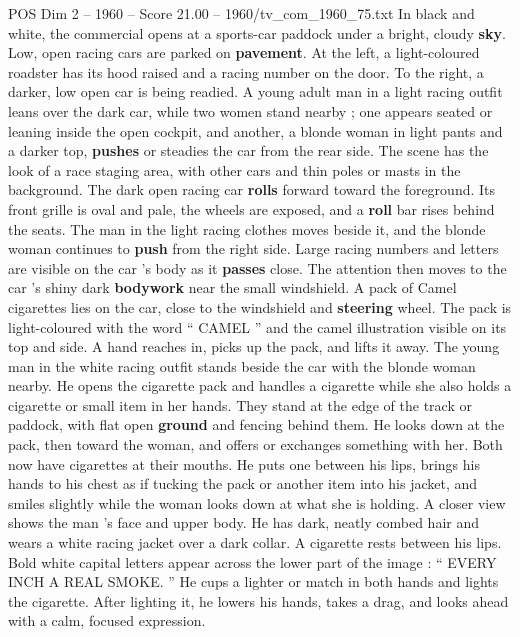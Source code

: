 \begin{textsample}{POS Dim 2 – 1960 – Score 21.00 – 1960/tv\_com\_1960\_75.txt}  \label{ex:f2_pos_008}
In black and white, the commercial opens at a sports-car paddock under a bright, cloudy \textbf{sky}.
Low, open racing cars are parked on \textbf{pavement}.
At the left, a light-coloured roadster has its hood raised and a racing number on the door.
To the right, a darker, low open car is being readied.
A young adult man in a light racing outfit leans over the dark car, while two women stand nearby ; one appears seated or leaning inside the open cockpit, and another, a blonde woman in light pants and a darker top, \textbf{pushes} or steadies the car from the rear side.
The scene has the look of a race staging area, with other cars and thin poles or masts in the background.
The dark open racing car \textbf{rolls} forward toward the foreground.
Its front grille is oval and pale, the wheels are exposed, and a \textbf{roll} bar rises behind the seats.
The man in the light racing clothes moves beside it, and the blonde woman continues to \textbf{push} from the right side.
Large racing numbers and letters are visible on the car ’s body as it \textbf{passes} close.
The attention then moves to the car ’s shiny dark \textbf{bodywork} near the small windshield.
A pack of Camel cigarettes lies on the car, close to the windshield and \textbf{steering} wheel.
The pack is light-coloured with the word “ CAMEL ” and the camel illustration visible on its top and side.
A hand reaches in, picks up the pack, and lifts it away.
The young man in the white racing outfit stands beside the car with the blonde woman nearby.
He opens the cigarette pack and handles a cigarette while she also holds a cigarette or small item in her hands.
They stand at the edge of the track or paddock, with flat open \textbf{ground} and fencing behind them.
He looks down at the pack, then toward the woman, and offers or exchanges something with her.
Both now have cigarettes at their mouths.
He puts one between his lips, brings his hands to his chest as if tucking the pack or another item into his jacket, and smiles slightly while the woman looks down at what she is holding.
A closer view shows the man ’s face and upper body.
He has dark, neatly combed hair and wears a white racing jacket over a dark collar.
A cigarette rests between his lips.
Bold white capital letters appear across the lower part of the image : “ EVERY INCH A REAL SMOKE. ” He cups a lighter or match in both hands and lights the cigarette.
After lighting it, he lowers his hands, takes a drag, and looks ahead with a calm, focused expression.

\end{textsample}
